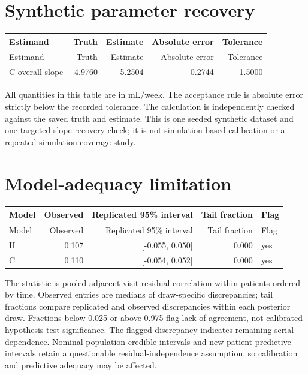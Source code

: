 \documentclass[11pt,letterpaper]{article}
\begin{document}
\section{Synthetic parameter recovery}
\begingroup\small\setlength{\tabcolsep}{5pt}\begin{longtable}{lrrrr}\toprule
Estimand & Truth & Estimate & Absolute error & Tolerance \\
\midrule\endfirsthead\toprule
Estimand & Truth & Estimate & Absolute error & Tolerance \\
\midrule\endhead\bottomrule\endfoot
C overall slope & -4.9760 & -5.2504 & 0.2744 & 1.5000 \\
\end{longtable}\endgroup
All quantities in this table are in mL/week. The acceptance rule is absolute error strictly below the recorded tolerance. The calculation is independently checked against the saved truth and estimate. This is one seeded synthetic dataset and one targeted slope-recovery check; it is not simulation-based calibration or a repeated-simulation coverage study.

\section{Model-adequacy limitation}
\begingroup\small\setlength{\tabcolsep}{5pt}\begin{longtable}{lrrrl}\toprule
Model & Observed & Replicated 95\% interval & Tail fraction & Flag \\
\midrule\endfirsthead\toprule
Model & Observed & Replicated 95\% interval & Tail fraction & Flag \\
\midrule\endhead\bottomrule\endfoot
H & 0.107 & [-0.055, 0.050] & 0.000 & yes \\
C & 0.110 & [-0.054, 0.052] & 0.000 & yes \\
\end{longtable}\endgroup
The statistic is pooled adjacent-visit residual correlation within patients ordered by time. Observed entries are medians of draw-specific discrepancies; tail fractions compare replicated and observed discrepancies within each posterior draw. Fractions below 0.025 or above 0.975 flag lack of agreement, not calibrated hypothesis-test significance. The flagged discrepancy indicates remaining serial dependence. Nominal population credible intervals and new-patient predictive intervals retain a questionable residual-independence assumption, so calibration and predictive adequacy may be affected.
\end{document}
